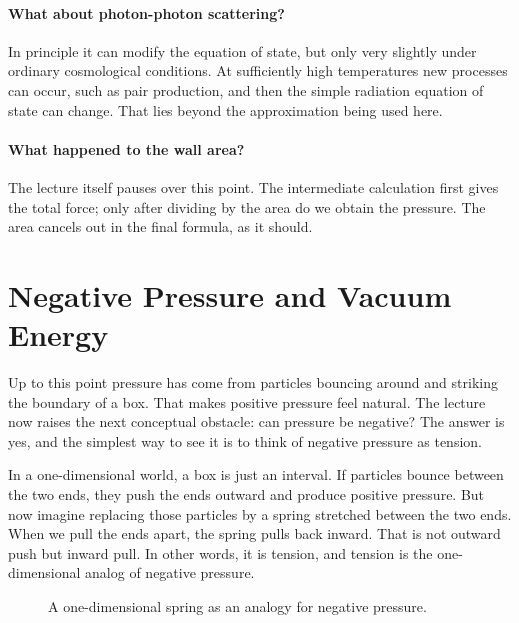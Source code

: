 \paragraph{What about photon-photon scattering?} In principle it can modify the equation of state, but only very slightly under ordinary cosmological conditions. At sufficiently high temperatures new processes can occur, such as pair production, and then the simple radiation equation of state can change. That lies beyond the approximation being used here.

\paragraph{What happened to the wall area?} The lecture itself pauses over this point. The intermediate calculation first gives the total force; only after dividing by the area do we obtain the pressure. The area cancels out in the final formula, as it should.

\section{Negative Pressure and Vacuum Energy}

Up to this point pressure has come from particles bouncing around and striking the boundary of a box. That makes positive pressure feel natural. The lecture now raises the next conceptual obstacle: can pressure be negative? The answer is yes, and the simplest way to see it is to think of negative pressure as tension.

In a one-dimensional world, a box is just an interval. If particles bounce between the two ends, they push the ends outward and produce positive pressure. But now imagine replacing those particles by a spring stretched between the two ends. When we pull the ends apart, the spring pulls back inward. That is not outward push but inward pull. In other words, it is tension, and tension is the one-dimensional analog of negative pressure.

\begin{figure}[h]
\centering
{}
\caption{A one-dimensional spring as an analogy for negative pressure.}
\end{figure}

